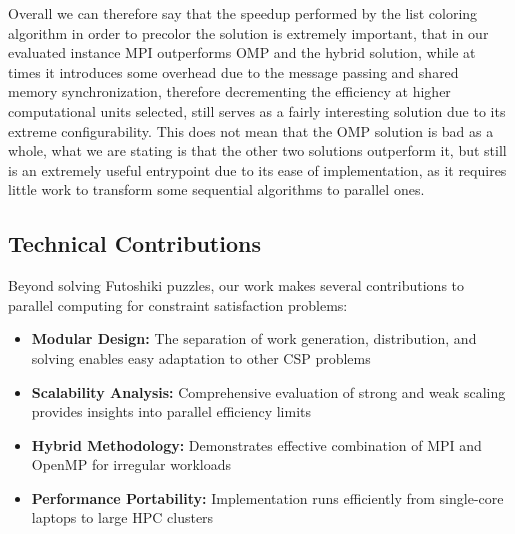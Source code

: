 Overall we can therefore say that the speedup performed by the list coloring algorithm in order to precolor the solution is extremely important, that in our evaluated instance MPI outperforms OMP and the hybrid solution, while at times it introduces some overhead due to the message passing and shared memory synchronization, therefore decrementing the efficiency at higher computational units selected, still serves as a fairly interesting solution due to its extreme configurability. This does not mean that the OMP solution is bad as a whole, what we are stating is that the other two solutions outperform it, but still is an extremely useful entrypoint due to its ease of implementation, as it requires little work to transform some sequential algorithms to parallel ones.


\subsection{Technical Contributions}
Beyond solving Futoshiki puzzles, our work makes several contributions to parallel computing for constraint satisfaction problems:

\begin{itemize}
    \item \textbf{Modular Design:} The separation of work generation, distribution, and solving enables easy adaptation to other CSP problems
    \item \textbf{Scalability Analysis:} Comprehensive evaluation of strong and weak scaling provides insights into parallel efficiency limits
    \item \textbf{Hybrid Methodology:} Demonstrates effective combination of MPI and OpenMP for irregular workloads
    \item \textbf{Performance Portability:} Implementation runs efficiently from single-core laptops to large HPC clusters
\end{itemize}